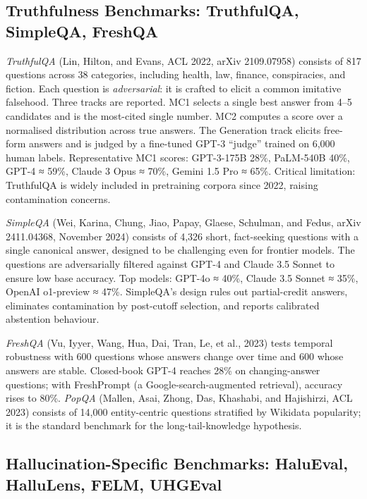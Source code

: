 \subsection{Truthfulness Benchmarks: TruthfulQA, SimpleQA, FreshQA}\label{truthfulness-benchmarks-truthfulqa-simpleqa-freshqa}

\emph{TruthfulQA} (Lin, Hilton, and Evans, ACL 2022, arXiv 2109.07958) consists of 817 questions across 38 categories, including health, law, finance, conspiracies, and fiction. Each question is \emph{adversarial}: it is crafted to elicit a common imitative falsehood. Three tracks are reported. MC1 selects a single best answer from 4--5 candidates and is the most-cited single number. MC2 computes a score over a normalised distribution across true answers. The Generation track elicits free-form answers and is judged by a fine-tuned GPT-3 ``judge'' trained on 6,000 human labels. Representative MC1 scores: GPT-3-175B 28\%, PaLM-540B 40\%, GPT-4 ≈ 59\%, Claude 3 Opus ≈ 70\%, Gemini 1.5 Pro ≈ 65\%. Critical limitation: TruthfulQA is widely included in pretraining corpora since 2022, raising contamination concerns.

\emph{SimpleQA} (Wei, Karina, Chung, Jiao, Papay, Glaese, Schulman, and Fedus, arXiv 2411.04368, November 2024) consists of 4,326 short, fact-seeking questions with a single canonical answer, designed to be challenging even for frontier models. The questions are adversarially filtered against GPT-4 and Claude 3.5 Sonnet to ensure low base accuracy. Top models: GPT-4o ≈ 40\%, Claude 3.5 Sonnet ≈ 35\%, OpenAI o1-preview ≈ 47\%. SimpleQA's design rules out partial-credit answers, eliminates contamination by post-cutoff selection, and reports calibrated abstention behaviour.

\emph{FreshQA} (Vu, Iyyer, Wang, Hua, Dai, Tran, Le, et al., 2023) tests temporal robustness with 600 questions whose answers change over time and 600 whose answers are stable. Closed-book GPT-4 reaches 28\% on changing-answer questions; with FreshPrompt (a Google-search-augmented retrieval), accuracy rises to 80\%. \emph{PopQA} (Mallen, Asai, Zhong, Das, Khashabi, and Hajishirzi, ACL 2023) consists of 14,000 entity-centric questions stratified by Wikidata popularity; it is the standard benchmark for the long-tail-knowledge hypothesis.

\subsection{Hallucination-Specific Benchmarks: HaluEval, HalluLens, FELM, UHGEval}\label{hallucination-specific-benchmarks-halueval-hallulens-felm-uhgeval}

